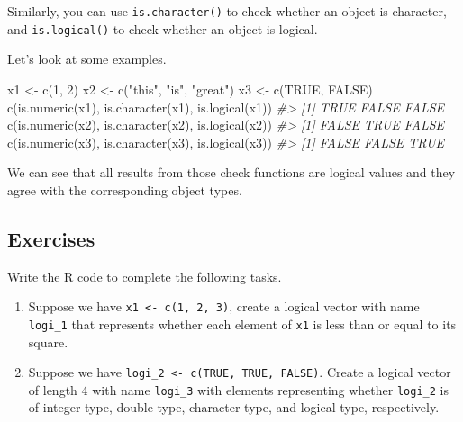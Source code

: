 \documentclass[
]{book}
\newenvironment{Shaded}{\begin{snugshade}}{\end{snugshade}}
\newcommand{\CommentTok}[1]{\textcolor[rgb]{0.56,0.35,0.01}{\textit{#1}}}
\newcommand{\ConstantTok}[1]{\textcolor[rgb]{0.00,0.00,0.00}{#1}}
\newcommand{\DecValTok}[1]{\textcolor[rgb]{0.00,0.00,0.81}{#1}}
\newcommand{\FunctionTok}[1]{\textcolor[rgb]{0.00,0.00,0.00}{#1}}
\newcommand{\NormalTok}[1]{#1}
\newcommand{\OtherTok}[1]{\textcolor[rgb]{0.56,0.35,0.01}{#1}}
\newcommand{\StringTok}[1]{\textcolor[rgb]{0.31,0.60,0.02}{#1}}
\begin{document}
Similarly, you can use \texttt{is.character()} to check whether an object is character, and \texttt{is.logical()} to check whether an object is logical.

Let's look at some examples.

\begin{Shaded}
\begin{Highlighting}[]
\NormalTok{x1 }\OtherTok{\textless{}{-}} \FunctionTok{c}\NormalTok{(}\DecValTok{1}\NormalTok{, }\DecValTok{2}\NormalTok{)}
\NormalTok{x2 }\OtherTok{\textless{}{-}} \FunctionTok{c}\NormalTok{(}\StringTok{"this"}\NormalTok{, }\StringTok{"is"}\NormalTok{, }\StringTok{"great"}\NormalTok{)}
\NormalTok{x3 }\OtherTok{\textless{}{-}} \FunctionTok{c}\NormalTok{(}\ConstantTok{TRUE}\NormalTok{, }\ConstantTok{FALSE}\NormalTok{)}
\FunctionTok{c}\NormalTok{(}\FunctionTok{is.numeric}\NormalTok{(x1), }\FunctionTok{is.character}\NormalTok{(x1), }\FunctionTok{is.logical}\NormalTok{(x1))}
\CommentTok{\#\textgreater{} [1]  TRUE FALSE FALSE}
\FunctionTok{c}\NormalTok{(}\FunctionTok{is.numeric}\NormalTok{(x2), }\FunctionTok{is.character}\NormalTok{(x2), }\FunctionTok{is.logical}\NormalTok{(x2))}
\CommentTok{\#\textgreater{} [1] FALSE  TRUE FALSE}
\FunctionTok{c}\NormalTok{(}\FunctionTok{is.numeric}\NormalTok{(x3), }\FunctionTok{is.character}\NormalTok{(x3), }\FunctionTok{is.logical}\NormalTok{(x3))}
\CommentTok{\#\textgreater{} [1] FALSE FALSE  TRUE}
\end{Highlighting}
\end{Shaded}

We can see that all results from those check functions are logical values and they agree with the corresponding object types.

\hypertarget{exercises-5}{%
\subsection{Exercises}\label{exercises-5}}

Write the R code to complete the following tasks.

\begin{enumerate}
\def\labelenumi{\arabic{enumi}.}
\item
  Suppose we have \texttt{x1\ \textless{}-\ c(1,\ 2,\ 3)}, create a logical vector with name \texttt{logi\_1} that represents whether each element of \texttt{x1} is less than or equal to its square.
\item
  Suppose we have \texttt{logi\_2\ \textless{}-\ c(TRUE,\ TRUE,\ FALSE)}. Create a logical vector of length 4 with name \texttt{logi\_3} with elements representing whether \texttt{logi\_2} is of integer type, double type, character type, and logical type, respectively.
\end{enumerate}
\end{document}
